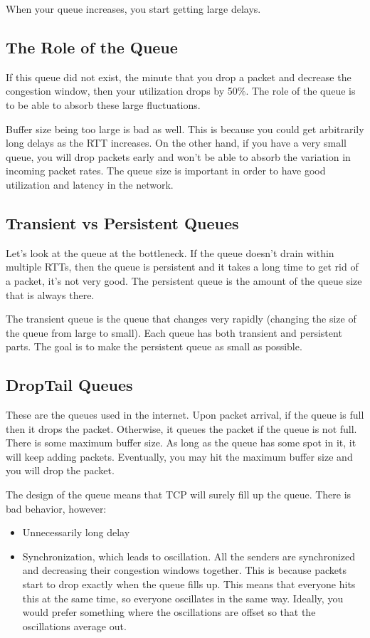 \documentclass[psamsfonts]{amsart}
\begin{document}
When your queue increases, you start getting large delays.

\subsection{The Role of the Queue}

If this queue did not exist, the minute that you drop a packet and decrease the congestion window, then your utilization drops by 50\%. The role of the queue is to be able to absorb these large fluctuations.

Buffer size being too large is bad as well. This is because you could get arbitrarily long delays as the RTT increases. On the other hand, if you have a very small queue, you will drop packets early and won't be able to absorb the variation in incoming packet rates. The queue size is important in order to have good utilization and latency in the network.

\subsection{Transient vs Persistent Queues}

Let's look at the queue at the bottleneck. If the queue doesn't drain within multiple RTTs, then the queue is persistent and it takes a long time to get rid of a packet, it's not very good. The persistent queue is the amount of the queue size that is always there. 

The transient queue is the queue that changes very rapidly (changing the size of the queue from large to small). Each queue has both transient and persistent parts. The goal is to make the persistent queue as small as possible. 

\subsection{DropTail Queues}

These are the queues used in the internet. Upon packet arrival, if the queue is full then it drops the packet. Otherwise, it queues the packet if the queue is not full. There is some maximum buffer size. As long as the queue has some spot in it, it will keep adding packets. Eventually, you may hit the maximum buffer size and you will drop the packet.

The design of the queue means that TCP will surely fill up the queue. There is bad behavior, however:
\begin{itemize}
  \item Unnecessarily long delay
  \item Synchronization, which leads to oscillation. All the senders are synchronized and decreasing their congestion windows together. This is because packets start to drop exactly when the queue fills up. This means that everyone hits this at the same time, so everyone oscillates in the same way. Ideally, you would prefer something where the oscillations are offset so that the oscillations average out.
\end{itemize}
\end{document}
